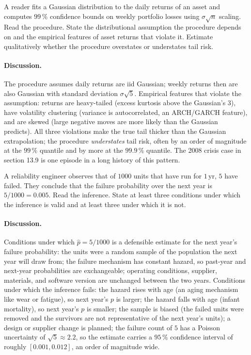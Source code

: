 \begin{exercise}
A reader fits a Gaussian distribution to the daily returns of an
asset and computes $99\,\%$ confidence bounds on weekly portfolio
losses using $\sigma\sqrt{n}$ scaling. Read the procedure. State
the distributional assumption the procedure depends on and the
empirical features of asset returns that violate it. Estimate
qualitatively whether the procedure overstates or understates tail
risk.
\end{exercise}

\paragraph{Discussion.}
The procedure assumes daily returns are iid Gaussian; weekly
returns then are also Gaussian with standard deviation
$\sigma\sqrt{5}$. Empirical features that violate the assumption:
returns are heavy-tailed (excess kurtosis above the Gaussian's
$3$), have volatility clustering (variance is autocorrelated, an
ARCH/GARCH feature), and are skewed (large negative moves are more
likely than the Gaussian predicts). All three violations make the
true tail thicker than the Gaussian extrapolation; the procedure
\emph{understates} tail risk, often by an order of magnitude at
the $99\,\%$ quantile and by more at the $99.9\,\%$ quantile. The
2008 crisis case in section 13.9 is one episode in a long history
of this pattern.

\begin{exercise}
A reliability engineer observes that of $1000$ units that have run
for $1\,\text{yr}$, $5$ have failed. They conclude that the failure
probability over the next year is $5/1000 = 0.005$. Read the
inference. State at least three conditions under which the
inference is valid and at least three under which it is not.
\end{exercise}

\paragraph{Discussion.}
Conditions under which $\hat p = 5/1000$ is a defensible estimate
for the next year's failure probability: the units were a random
sample of the population the next year will draw from; the failure
mechanism has constant hazard, so past-year and next-year
probabilities are exchangeable; operating conditions, supplier,
materials, and software version are unchanged between the two years.
Conditions under which the inference fails: the hazard rises with
age (an aging mechanism like wear or fatigue), so next year's $p$
is larger; the hazard falls with age (infant mortality), so next
year's $p$ is smaller; the sample is biased (the failed units were
removed and the survivors are not representative of the next
year's units); a design or supplier change is planned; the failure
count of $5$ has a Poisson uncertainty of $\sqrt{5} \approx 2.2$,
so the estimate carries a $95\,\%$ confidence interval of roughly
$[0.001, 0.012]$, an order of magnitude wide.

